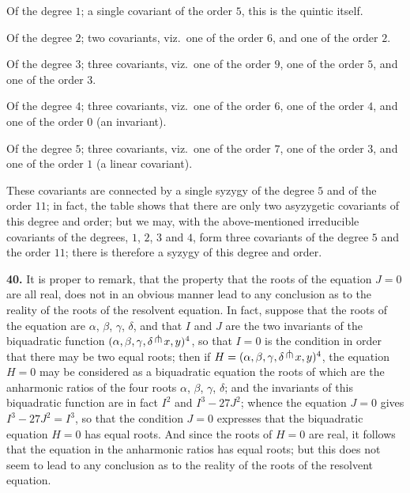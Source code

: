 \documentclass[11pt,a4paper]{article}
\begin{document}
Of the degree $1$; a single covariant of the order $5$, this is the quintic itself.

Of the degree $2$; two covariants, viz.\ one of the order $6$, and one of the order $2$.

Of the degree $3$; three covariants, viz.\ one of the order $9$, one of the order $5$, and one of the order $3$.

Of the degree $4$; three covariants, viz.\ one of the order $6$, one of the order $4$, and one of the order $0$ (an invariant).

Of the degree $5$; three covariants, viz.\ one of the order $7$, one of the order $3$, and one of the order $1$ (a linear covariant).

These covariants are connected by a single syzygy of the degree $5$ and of the order $11$; in fact, the table shows that there are only two asyzygetic covariants of this degree and order; but we may, with the above-mentioned irreducible covariants of the degrees, $1$, $2$, $3$ and $4$, form three covariants of the degree $5$ and the order $11$; there is therefore a syzygy of this degree and order.

\clearpage
\setcounter{page}{265}

\textbf{40.} It is proper to remark, that the property that the roots of the equation $J=0$ are all real, does not in an obvious manner lead to any conclusion as to the reality of the roots of the resolvent equation. In fact, suppose that the roots of the equation are $\alpha$, $\beta$, $\gamma$, $\delta$, and that $I$ and $J$ are the two invariants of the biquadratic function $(\alpha,\beta,\gamma,\delta\,\raisebox{0.5ex}{$\pitchfork$}\, x, y)^{4}$, so that $I=0$ is the condition in order that there may be two equal roots; then if $H=(\alpha,\beta,\gamma,\delta\,\raisebox{0.5ex}{$\pitchfork$}\, x, y)^{4}$, the equation $H=0$ may be considered as a biquadratic equation the roots of which are the anharmonic ratios of the four roots $\alpha$, $\beta$, $\gamma$, $\delta$; and the invariants of this biquadratic function are in fact $I^{2}$ and $I^{3}-27J^{2}$; whence the equation $J=0$ gives $I^{3}-27J^{2}=I^{3}$, so that the condition $J=0$ expresses that the biquadratic equation $H=0$ has equal roots. And since the roots of $H=0$ are real, it follows that the equation in the anharmonic ratios has equal roots; but this does not seem to lead to any conclusion as to the reality of the roots of the resolvent equation.
\end{document}
